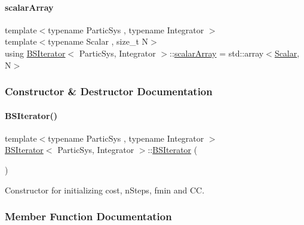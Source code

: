 \paragraph{\texorpdfstring{scalar\+Array}{scalarArray}}
{\footnotesize\ttfamily template$<$typename Partic\+Sys , typename Integrator $>$ \\
template$<$typename Scalar , size\+\_\+t N$>$ \\
using \mbox{\hyperlink{class_b_s_iterator}{B\+S\+Iterator}}$<$ Partic\+Sys, Integrator $>$\+::\mbox{\hyperlink{class_b_s_iterator_ab0aa7c10b56500273af05dcd85fd8389}{scalar\+Array}} =  std\+::array$<$\mbox{\hyperlink{class_b_s_iterator_a7857f8ff9032955ea4dcc22cd18ca7a1}{Scalar}}, N$>$}



\subsubsection{Constructor \& Destructor Documentation}
\mbox{\label{class_b_s_iterator_a144fb5c55fcd7bc873e73f4d06276fb2}} 
\paragraph{\texorpdfstring{B\+S\+Iterator()}{BSIterator()}}
{\footnotesize\ttfamily template$<$typename Partic\+Sys , typename Integrator $>$ \\
\mbox{\hyperlink{class_b_s_iterator}{B\+S\+Iterator}}$<$ Partic\+Sys, Integrator $>$\+::\mbox{\hyperlink{class_b_s_iterator}{B\+S\+Iterator}} (\begin{DoxyParamCaption}{ }\end{DoxyParamCaption})}



Constructor for initializing cost, n\+Steps, fmin and CC. 



\subsubsection{Member Function Documentation}
\mbox{\label{class_b_s_iterator_a42976d786ffe422a86cc5a7b0a077609}} 

